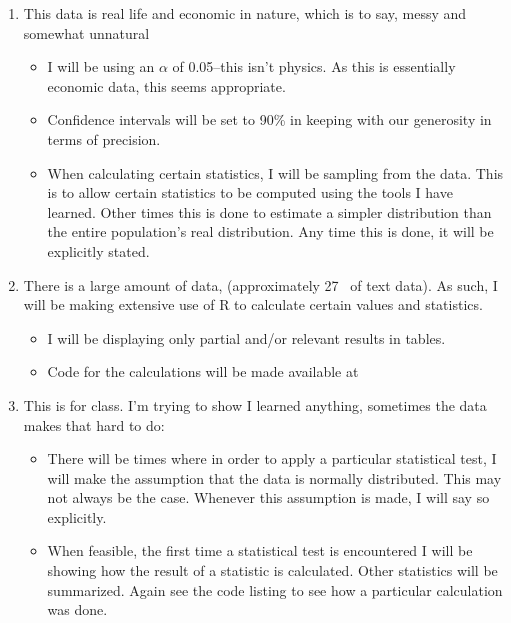 \documentclass[letterpaper]{article}
\theoremstyle{definition}
\begin{document}
\begin{enumerate} \item This data is real life and economic in nature, which is to say, messy
	and somewhat unnatural

  \begin{itemize}
  \item
    I will be using an $\alpha$ of 0.05–this isn't physics. As this is essentially
	economic data, this seems appropriate.
  \item
	  Confidence intervals will be set to 90\% in keeping with our generosity in terms of
	  precision.
\item
	When calculating certain statistics, I will be sampling from the data. This is to
	allow certain statistics to be computed using the tools I have learned. Other times
	this is done to estimate a simpler distribution than the entire population's real
	distribution. Any time this is done, it will be explicitly stated.
  \end{itemize}
\item
	There is a large amount of data, (approximately 27\unit{\mega\byte} of text data). As
	such, I will be making extensive use of R to calculate certain values and statistics.

  \begin{itemize}
	\item
		I will be displaying only partial and/or relevant results in tables.
	\item
		Code for the calculations will be made available at 

  \end{itemize}
\item
  This is for class. I'm trying to show I learned anything, sometimes
  the data makes that hard to do:

  \begin{itemize}
  \item
	  There will be times where in order to apply a particular statistical test, I will
	  make the assumption that the data is normally distributed. This may not always be
	  the case. Whenever this assumption is made, I will say so explicitly.
	\item
		When feasible, the first time a statistical test is encountered I will be showing
		how the result of a statistic is calculated. Other statistics will be summarized.
		Again see the code listing to see how a particular calculation was done.
  \end{itemize}
\end{enumerate}
\end{document}
